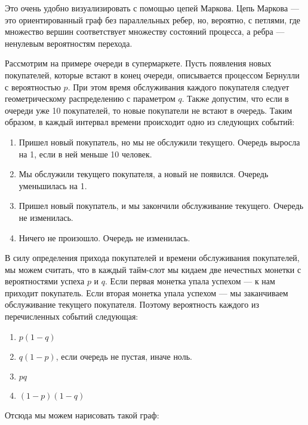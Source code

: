 \documentclass[12pt]{article}
\begin{document}
Это очень удобно визуализировать с помощью цепей Маркова. Цепь Маркова --- это ориентированный граф без параллельных ребер, но, вероятно, с петлями, где множество вершин соответствует множеству состояний процесса, а ребра --- ненулевым вероятностям перехода.

Рассмотрим на примере очереди в супермаркете. Пусть появления новых покупателей, которые встают в конец очереди, описывается процессом Бернулли с вероятностью $p$. При этом время обслуживания каждого покупателя следует геометрическому распределению с параметром $q$. Также допустим, что если в очереди уже 10 покупателей, то новые покупатели не встают в очередь. Таким образом, в каждый интервал времени происходит одно из следующих событий:
\begin{enumerate}
  \item Пришел новый покупатель, но мы не обслужили текущего. Очередь выросла на 1, если в ней меньше 10 человек.
  \item Мы обслужили текущего покупателя, а новый не появился. Очередь уменьшилась на 1.
  \item Пришел новый покупатель, и мы закончили обслуживание текущего. Очередь не изменилась.
  \item Ничего не произошло. Очередь не изменилась.
\end{enumerate}
В силу определения прихода покупателей и времени обслуживания покупателей, мы можем считать, что в каждый тайм-слот мы кидаем две нечестных монетки с вероятностями успеха $p$ и $q$. Если первая монетка упала успехом --- к нам приходит покупатель. Если вторая монетка упала успехом --- мы заканчиваем обслуживание текущего покупателя. Поэтому вероятность каждого из перечисленных событий следующая:
\begin{enumerate}
  \item $p(1 - q)$
  \item $q(1 - p)$, если очередь не пустая, иначе ноль.
  \item $pq$
  \item $(1 - p)(1 - q)$
\end{enumerate}
Отсюда мы можем нарисовать такой граф:
\end{document}
